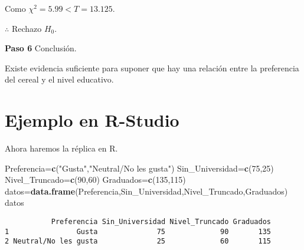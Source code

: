 \documentclass[
  a4paper,
  oneside,
  openany]{book}
\newenvironment{Shaded}{\begin{snugshade}}{\end{snugshade}}
\newcommand{\DecValTok}[1]{\textcolor[rgb]{0.00,0.00,0.81}{#1}}
\newcommand{\FunctionTok}[1]{\textcolor[rgb]{0.13,0.29,0.53}{\textbf{#1}}}
\newcommand{\NormalTok}[1]{#1}
\newcommand{\OtherTok}[1]{\textcolor[rgb]{0.56,0.35,0.01}{#1}}
\newcommand{\StringTok}[1]{\textcolor[rgb]{0.31,0.60,0.02}{#1}}
\begin{document}
Como \(\chi^2=5.99 < T=13.125.\)

\(\therefore\) Rechazo \(H_0\).

\textbf{Paso 6} Conclusión.

Existe evidencia suficiente para suponer que hay una relación entre la preferencia del cereal y el nivel educativo.

\hypertarget{ejemplo-en-r-studio-10}{%
\section{Ejemplo en R-Studio}\label{ejemplo-en-r-studio-10}}

Ahora haremos la réplica en R.

\begin{Shaded}
\begin{Highlighting}[]
\NormalTok{Preferencia}\OtherTok{=}\FunctionTok{c}\NormalTok{(}\StringTok{"Gusta"}\NormalTok{,}\StringTok{"Neutral/No les gusta"}\NormalTok{)}
\NormalTok{Sin\_Universidad}\OtherTok{=}\FunctionTok{c}\NormalTok{(}\DecValTok{75}\NormalTok{,}\DecValTok{25}\NormalTok{)}
\NormalTok{Nivel\_Truncado}\OtherTok{=}\FunctionTok{c}\NormalTok{(}\DecValTok{90}\NormalTok{,}\DecValTok{60}\NormalTok{)}
\NormalTok{Graduados}\OtherTok{=}\FunctionTok{c}\NormalTok{(}\DecValTok{135}\NormalTok{,}\DecValTok{115}\NormalTok{)}
\NormalTok{datos}\OtherTok{=}\FunctionTok{data.frame}\NormalTok{(Preferencia,Sin\_Universidad,Nivel\_Truncado,Graduados)}
\NormalTok{datos}
\end{Highlighting}
\end{Shaded}

\begin{verbatim}
           Preferencia Sin_Universidad Nivel_Truncado Graduados
1                Gusta              75             90       135
2 Neutral/No les gusta              25             60       115
\end{verbatim}
\end{document}

